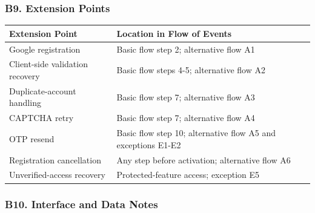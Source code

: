 \documentclass[12pt]{article}
\renewcommand{\baselinestretch}{1.5}
\begin{document}
\hypertarget{sec:b9-extension-points}{}
\subsubsection*{B9. Extension Points}
\par\medskip

\begingroup
\small
\renewcommand{\baselinestretch}{1.0}\selectfont
\renewcommand{\arraystretch}{1.15}
\setlength{\tabcolsep}{6pt}
\begin{longtable}{|>{\raggedright\arraybackslash}p{}|>{\raggedright\arraybackslash}p{}|}
\hline
\textbf{Extension Point} & \textbf{Location in Flow of Events} \\ \hline
\endhead
Google registration & Basic flow step 2; alternative flow A1 \\ \hline
Client-side validation recovery & Basic flow steps 4-5; alternative flow A2 \\ \hline
Duplicate-account handling & Basic flow step 7; alternative flow A3 \\ \hline
CAPTCHA retry & Basic flow step 7; alternative flow A4 \\ \hline
OTP resend & Basic flow step 10; alternative flow A5 and exceptions E1-E2 \\ \hline
Registration cancellation & Any step before activation; alternative flow A6 \\ \hline
Unverified-access recovery & Protected-feature access; exception E5 \\ \hline
\end{longtable}
\endgroup
\par\medskip

\hypertarget{sec:b10-interface-and-data-notes}{}
\subsubsection*{B10. Interface and Data Notes}
\par\medskip
\end{document}

